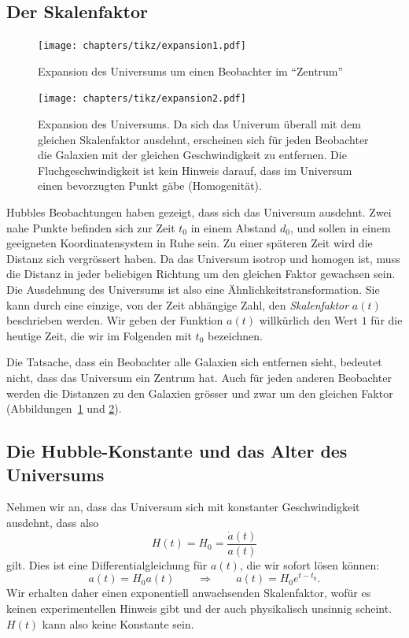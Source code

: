 \subsection{Der Skalenfaktor}
\begin{figure}
\centering
\texttt{[image: chapters/tikz/expansion1.pdf]}
\caption{Expansion des Universums um einen Beobachter im ``Zentrum''
\label{skript:figure:expansion1}}
\end{figure}
\begin{figure}
\centering
\texttt{[image: chapters/tikz/expansion2.pdf]}
\caption{Expansion des Universums. Da sich das Univerum überall
mit dem gleichen Skalenfaktor ausdehnt, erscheinen sich für jeden
Beobachter die Galaxien mit der gleichen Geschwindigkeit zu entfernen.
Die Fluchgeschwindigkeit ist kein Hinweis darauf, dass im Universum
einen bevorzugten Punkt gäbe (Homogenität).
\label{skript:figure:expansion2}}
\end{figure}
Hubbles Beobachtungen haben gezeigt, dass sich das Universum ausdehnt.
Zwei nahe Punkte befinden sich zur Zeit $t_0$ in einem Abstand $d_0$,
und sollen in einem geeigneten Koordinatensystem in Ruhe sein.
Zu einer späteren Zeit wird die Distanz sich vergrössert haben.
Da das Universum isotrop und homogen ist, muss die Distanz in jeder
beliebigen Richtung um den gleichen Faktor gewachsen sein.
Die Ausdehnung des Universums ist also eine Ähnlichkeitstransformation.
Sie kann durch eine einzige, von der Zeit abhängige Zahl,
den {\em Skalenfaktor} $a(t)$ beschrieben werden.
%
Wir geben der Funktion $a(t)$ willkürlich den Wert $1$ für die heutige
Zeit, die wir im Folgenden mit $t_0$ bezeichnen.

Die Tatsache, dass ein Beobachter alle Galaxien sich entfernen
sieht, bedeutet nicht, dass das Universum ein Zentrum hat.
Auch für jeden anderen Beobachter werden die Distanzen zu den
Galaxien grösser und zwar um den gleichen Faktor
(Abbildungen~\ref{skript:figure:expansion1} und
\ref{skript:figure:expansion2}).

\subsection{Die Hubble-Konstante und das Alter des Universums}
%
%
Nehmen wir an, dass das Universum sich mit konstanter Geschwindigkeit
ausdehnt, dass also 
\[
H(t)=H_0=\frac{\dot a(t)}{a(t)}
\]
gilt.
%
Dies ist eine Differentialgleichung für $a(t)$, die wir sofort
lösen können:
\[
a(t) = H_0a(t)
\qquad \Rightarrow\qquad
a(t)=H_0 e^{t-t_0}.
\]
Wir erhalten daher einen exponentiell anwachsenden Skalenfaktor,
wofür es keinen experimentellen Hinweis gibt und der auch physikalisch
unsinnig scheint.
$H(t)$ kann also keine Konstante sein.

